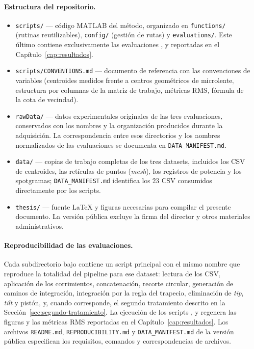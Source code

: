 \documentclass[letterpaper,12pt,oneside]{book}
\begin{document}
\paragraph{Estructura del repositorio.}
\begin{itemize}
\item \texttt{scripts/} --- código MATLAB del método, organizado en \texttt{functions/} (rutinas reutilizables), \texttt{config/} (gestión de rutas) y \texttt{evaluations/}. Este último contiene exclusivamente las evaluaciones ,  y  reportadas en el Capítulo~\ref{cap:resultados}.
\item \texttt{scripts/CONVENTIONS.md} --- documento de referencia con las convenciones de variables (centroides medidos frente a centros geométricos de microlente, estructura por columnas de la matriz de trabajo, métricas RMS, fórmula de la cota de vecindad).
\item \texttt{rawData/} --- datos experimentales originales de las tres evaluaciones, conservados con los nombres y la organización producidos durante la adquisición. La correspondencia entre esos directorios y los nombres normalizados de las evaluaciones se documenta en \texttt{DATA\_MANIFEST.md}.
\item \texttt{data/} --- copias de trabajo completas de los tres datasets, incluidos los CSV de centroides, las retículas de puntos (\textit{mesh}), los registros de potencia y los spotgramas; \texttt{DATA\_MANIFEST.md} identifica los 23 CSV consumidos directamente por los scripts.
\item \texttt{thesis/} --- fuente \LaTeX{} y figuras necesarias para compilar el presente documento. La versión pública excluye la firma del director y otros materiales administrativos.
\end{itemize}

\paragraph{Reproducibilidad de las evaluaciones.} Cada subdirectorio bajo  contiene un script principal con el mismo nombre que reproduce la totalidad del pipeline para ese dataset: lectura de los CSV, aplicación de los corrimientos, concatenación, recorte circular, generación de caminos de integración, integración por la regla del trapecio, eliminación de \textit{tip}, \textit{tilt} y pistón, y, cuando corresponde, el segundo tratamiento descrito en la Sección~\ref{sec:segundo-tratamiento}. La ejecución de los scripts ,  y  regenera las figuras y las métricas RMS reportadas en el Capítulo~\ref{cap:resultados}. Los archivos \texttt{README.md}, \texttt{REPRODUCIBILITY.md} y \texttt{DATA\_MANIFEST.md} de la versión pública especifican los requisitos, comandos y correspondencias de archivos.
\end{document}
